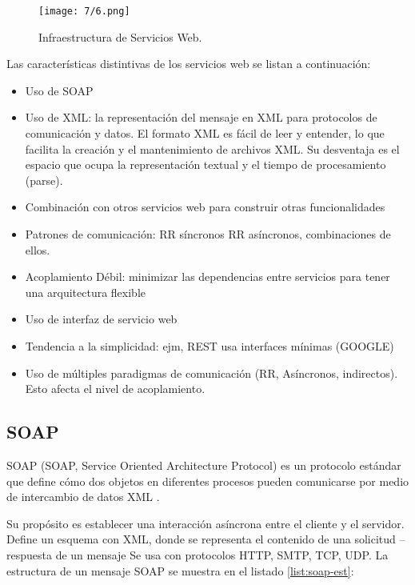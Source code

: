  \begin{figure}%
 		\centering
 	\texttt{[image: 7/6.png]}
 	\caption{Infraestructura de Servicios Web.}
 	\label{fig:infraestructura}
 \end{figure}
 
Las características distintivas de los servicios web se listan a continuaci\'on:
 		\begin{itemize}
 			\item Uso de SOAP 
 			\item Uso de XML: la representación del mensaje en  XML para protocolos de comunicaci\'on y datos.   El formato XML es fácil de leer y entender, lo que facilita la creación y el mantenimiento de archivos XML. Su desventaja es el espacio que ocupa la representación textual y el tiempo de procesamiento (parse).   
 			\item Combinación con otros servicios web para construir otras funcionalidades 
 			\item Patrones de comunicación: RR síncronos  RR asíncronos, combinaciones de ellos.  		   		
 	
 			\item Acoplamiento Débil: minimizar las dependencias entre servicios para tener una arquitectura flexible 			
 			\item Uso de \gls{interfaz de servicio web} 		
 			\item Tendencia a la simplicidad: ejm, REST usa interfaces mínimas (GOOGLE) 			
 			\item	Uso de múltiples paradigmas de comunicación (RR, Asíncronos, indirectos). Esto afecta el nivel de acoplamiento.    		
 	 	\end{itemize}
 		
 	
 	  \subsection{SOAP}
 	  
 	   SOAP (SOAP, Service Oriented Architecture Protocol) es un protocolo estándar que define cómo dos objetos en diferentes procesos pueden comunicarse por medio de intercambio de datos XML \cite{W3C2022}.
 	    		
 	  Su propósito es establecer una interacción asíncrona entre el cliente y el servidor.  Define un esquema con XML, donde se representa el contenido de una solicitud – respuesta de un mensaje
 	  Se usa con protocolos HTTP, SMTP, TCP, UDP.
 	  La estructura de un mensaje SOAP se muestra en el listado \ref{list:soap-est}:
 	  
